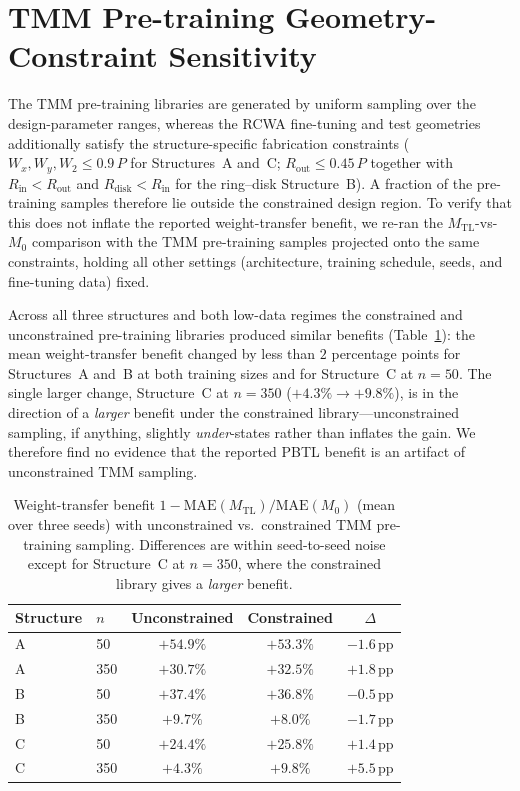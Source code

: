 \documentclass[11pt]{article}
\newcommand{\Mzero}{\ensuremath{M_0}}
\newcommand{\Mtl}{\ensuremath{M_\text{TL}}}
\begin{document}
\section{TMM Pre-training Geometry-Constraint Sensitivity}
\label{sec:si_constraint_sensitivity}

The TMM pre-training libraries are generated by uniform sampling over the
design-parameter ranges, whereas the RCWA fine-tuning and test geometries
additionally satisfy the structure-specific fabrication constraints
($W_x, W_y, W_2 \le 0.9\,P$ for Structures~A and~C; $R_\text{out}\le 0.45\,P$
together with $R_\text{in}<R_\text{out}$ and $R_\text{disk}<R_\text{in}$ for the
ring--disk Structure~B). A fraction of the pre-training samples therefore lie
outside the constrained design region. To verify that this does not inflate the
reported weight-transfer benefit, we re-ran the $\Mtl$-vs-$\Mzero$ comparison
with the TMM pre-training samples projected onto the same constraints, holding all
other settings (architecture, training schedule, seeds, and fine-tuning data)
fixed.

Across all three structures and both low-data regimes the constrained and
unconstrained pre-training libraries produced similar benefits
(Table~\ref{tab:constraint_sensitivity}): the mean weight-transfer benefit changed
by less than $2$ percentage points for Structures~A and~B at both training sizes
and for Structure~C at $n=50$. The single larger change, Structure~C at $n=350$
($+4.3\% \to +9.8\%$), is in the direction of a \emph{larger} benefit under the
constrained library---unconstrained sampling, if anything, slightly
\emph{under}-states rather than inflates the gain. We therefore find no evidence
that the reported PBTL benefit is an artifact of unconstrained TMM sampling.

\begin{table}[htbp]\centering\small
\caption{Weight-transfer benefit $1-\mathrm{MAE}(\Mtl)/\mathrm{MAE}(\Mzero)$
(mean over three seeds) with unconstrained vs.\ constrained TMM pre-training
sampling. Differences are within seed-to-seed noise except for Structure~C at
$n=350$, where the constrained library gives a \emph{larger} benefit.}
\label{tab:constraint_sensitivity}
\begin{tabular}{llccc}\toprule
\textbf{Structure} & \textbf{$n$} & \textbf{Unconstrained} & \textbf{Constrained} & \textbf{$\Delta$}\\\midrule
A & 50  & $+54.9\%$ & $+53.3\%$ & $-1.6$\,pp\\
A & 350 & $+30.7\%$ & $+32.5\%$ & $+1.8$\,pp\\
B & 50  & $+37.4\%$ & $+36.8\%$ & $-0.5$\,pp\\
B & 350 & $+9.7\%$  & $+8.0\%$  & $-1.7$\,pp\\
C & 50  & $+24.4\%$ & $+25.8\%$ & $+1.4$\,pp\\
C & 350 & $+4.3\%$  & $+9.8\%$  & $+5.5$\,pp\\\bottomrule
\end{tabular}
\end{table}
\end{document}
